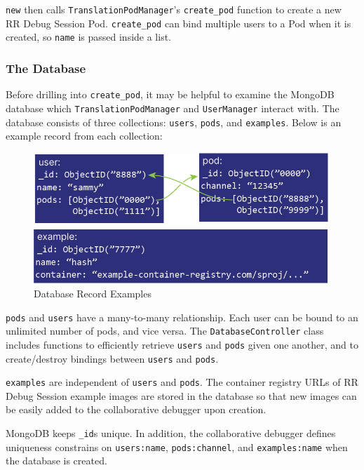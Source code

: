 \documentclass[12pt]{article}
\begin{document}
\lstinline{new} then calls \lstinline{TranslationPodManager}'s
\lstinline{create_pod} function to create a new RR Debug Session Pod.
\lstinline{create_pod} can bind multiple users to a Pod when it is
created, so \lstinline{name} is passed inside a list.

\subsubsection{The Database} Before drilling into \lstinline{create_pod},
it may be helpful to examine the MongoDB database which
\lstinline{TranslationPodManager} and \lstinline{UserManager} interact
with.  The database consists of three collections: \lstinline{users},
\lstinline{pods}, and \lstinline{examples}.  Below is an example
record from each collection:

\begin{figure}[h!]

  \includegraphics[scale=1]{database_example}
  \centering
  \caption{Database Record Examples}
  \label{rr:detailed}
\end{figure}

\lstinline{pods} and \lstinline{users} have a many-to-many
relationship.  Each user can be bound to an unlimited number of pods,
and vice versa.  The \lstinline{DatabaseController} class includes
functions to efficiently retrieve \lstinline{users} and
\lstinline{pods} given one another, and to create/destroy bindings
between \lstinline{users} and \lstinline{pods}.
\par

\lstinline{examples} are independent of \lstinline{users} and
\lstinline{pods}.  The container registry URLs of RR Debug Session
example images are stored in the database so that new images can be
easily added to the collaborative debugger upon creation.
\par

MongoDB keeps \lstinline{_id}s unique.  In addition, the collaborative
debugger defines uniqueness constrains on \lstinline{users:name},
\lstinline{pods:channel}, and \lstinline{examples:name} when the
database is created.
\end{document}
